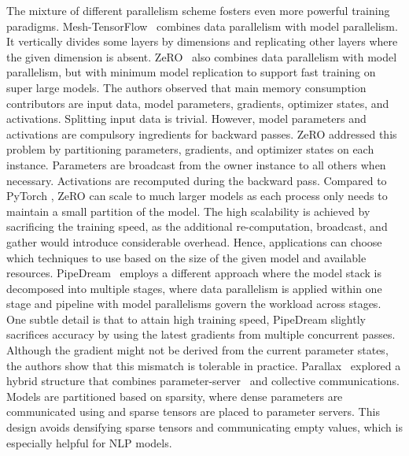 The mixture of different parallelism scheme fosters even more powerful training paradigms. Mesh-TensorFlow~\cite{shazeer2018mesh} combines data parallelism with model parallelism. It vertically divides some layers by dimensions and replicating other layers where the given dimension is absent. ZeRO~\cite{rajbhandari2019zero} also combines data parallelism with model parallelism, but with minimum model replication to support fast training on super large models. The authors observed that main memory consumption contributors are input data, model parameters, gradients, optimizer states, and activations. Splitting input data is trivial. However, model parameters and activations are compulsory ingredients for backward passes. ZeRO addressed this problem by partitioning parameters, gradients, and optimizer states on each  instance. Parameters are broadcast from the owner  instance to all others when necessary. Activations are recomputed during the backward pass. Compared to PyTorch , ZeRO can scale to much larger models as each process only needs to maintain a small partition of the model. The high scalability is achieved by sacrificing the training speed, as the additional re-computation, broadcast, and gather would introduce considerable overhead. Hence, applications can choose which techniques to use based on the size of the given model and available resources. PipeDream~\cite{narayanan2019pipedream} employs a different approach where the model stack is decomposed into multiple stages, where data parallelism is applied within one stage and pipeline with model parallelisms govern the workload across stages. One subtle detail is that to attain high training speed, PipeDream slightly sacrifices accuracy by using the latest gradients from multiple concurrent passes. Although the gradient might not be derived from the current parameter states, the authors show that this mismatch is tolerable in practice.  Parallax~\cite{parallax} explored a hybrid structure that combines parameter-server~\cite{ps} and collective communications. Models are partitioned based on  sparsity, where dense parameters are communicated using  and sparse tensors are placed to parameter servers. This design avoids densifying sparse tensors and communicating empty values, which is especially helpful for NLP models. 

